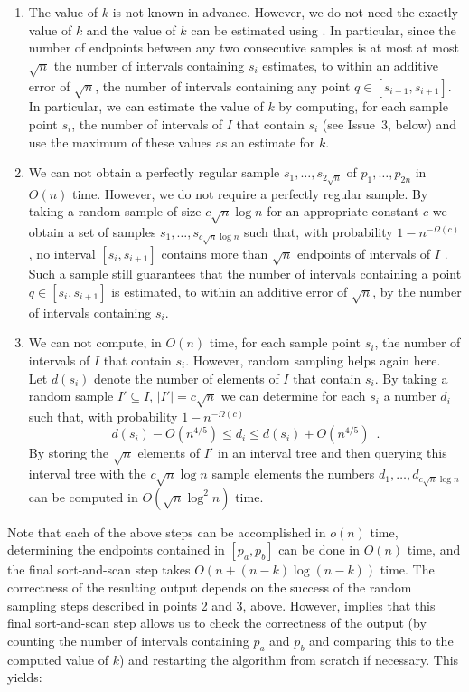 \documentclass[charterfonts,lotsofwhite]{patmorin}
\begin{document}
\begin{enumerate}

\item The value of $k$ is not known in advance.  However, we do not
need the exactly value of $k$ and the value of $k$ can be estimated
using .  In particular, since the number of endpoints
between any two consecutive samples is at most at most $\sqrt{n}$ the
number of intervals containing $s_i$ estimates, to within an additive
error of $\sqrt{n}$, the number of intervals containing any point $q\in
[s_{i-1},s_{i+1}]$. In particular, we can estimate the value of $k$ by
computing, for each sample point $s_i$, the number of intervals of $I$
that contain $s_i$ (see Issue~3, below) and use the maximum of these
values as an estimate for $k$.

\item We can not obtain a perfectly regular sample
$s_1,\ldots,s_{2\sqrt{n}}$ of $p_1,\ldots,p_{2n}$ in $O(n)$ time.
However, we do not require a perfectly regular sample.  By taking a
random sample of size $c\sqrt{n}\log n$ for an appropriate constant
$c$ we obtain a set of samples $s_1,\ldots,s_{c\sqrt{n}\log n}$ such
that, with probability $1-n^{-\Omega(c)}$, no interval
$[s_{i},s_{i+1}]$ contains more than $\sqrt{n}$ endpoints of intervals
of $I$ \cite{m98}.  Such a sample still guarantees that the number of
intervals containing a point $q\in [s_i,s_{i+1}]$ is estimated, to
within an additive error of $\sqrt{n}$, by the number of intervals
containing $s_i$.

\item We can not compute, in $O(n)$ time, for each sample point $s_i$,
the number of intervals of $I$ that contain $s_i$.  However, random
sampling helps again here.  Let $d(s_i)$ denote the number of elements
of $I$ that contain $s_i$. By taking a random sample $I'\subseteq I$,
$|I'|=c\sqrt{n}$ we can determine for each $s_i$ a
number $d_i$ such that, with probability $1-n^{-\Omega(c)}$
\[
        d(s_i) - O(n^{4/5})\le d_i \le
           d(s_i) + O(n^{4/5}) \enspace .
\]
By storing the $\sqrt{n}$ elements of $I'$ in an interval tree \cite{ps85} and
then querying this interval tree with the $c\sqrt{n}\log n$ sample
elements the numbers $d_1,\ldots,d_{c\sqrt{n}\log n}$ can be computed
in $O(\sqrt{n}\log^2 n)$
time.  
\end{enumerate}

Note that each of the above steps can be accomplished in $o(n)$ time,
determining the endpoints contained in $[p_a,p_b]$ can be done in
$O(n)$ time, and the final sort-and-scan step takes $O(n + (n-k)\log
(n-k))$ time.  The correctness of the resulting output depends on the
success of the random sampling steps described in points 2 and 3,
above.  However,  implies that this final sort-and-scan
step allows us to check the correctness of the output (by counting the
number of intervals containing $p_a$ and $p_b$ and comparing this to
the computed value of $k$) and restarting the algorithm from scratch
if necessary.  This yields:
\end{document}
